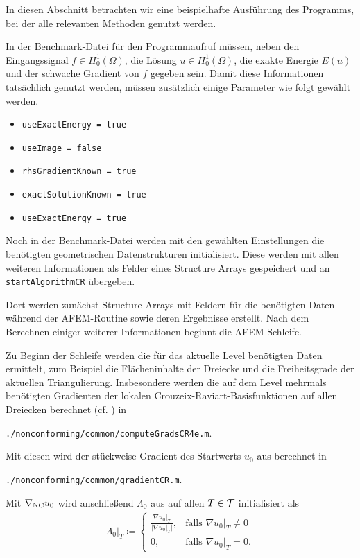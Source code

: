 In diesen Abschnitt betrachten wir eine beispielhafte Ausführung des Programms,
bei der alle relevanten Methoden genutzt werden.

In der Benchmark-Datei für den Programmaufruf müssen, neben den Eingangssignal
$f\in H^1_0(\Omega)$, die Lösung $u\in H^1_0(\Omega)$, die exakte Energie
$E(u)$ und der schwache Gradient von $f$ gegeben sein. 
Damit diese Informationen tatsächlich genutzt werden, müssen zusätzlich einige
Parameter wie folgt gewählt werden.
\begin{itemize}
  \item \texttt{useExactEnergy = true}
  \item \texttt{useImage = false}
  \item \texttt{rhsGradientKnown = true}
  \item \texttt{exactSolutionKnown = true}
  \item \texttt{useExactEnergy = true}
\end{itemize}

Noch in der Benchmark-Datei werden mit den gewählten Einstellungen die
benötigten geometrischen Datenstrukturen initialisiert. 
Diese werden mit allen weiteren Informationen als Felder eines Structure Arrays
gespeichert und an \texttt{startAlgorithmCR} übergeben. 

Dort werden zunächst Structure Arrays mit Feldern für die benötigten Daten
während der AFEM-Routine sowie deren Ergebnisse erstellt. 
Nach dem Berechnen einiger weiterer Informationen beginnt die AFEM-Schleife.

Zu Beginn der Schleife werden die für das aktuelle Level benötigten Daten
ermittelt, zum Beispiel die Flächeninhalte der Dreiecke und die Freiheitsgrade
der aktuellen Triangulierung. 
Insbesondere werden die auf dem Level mehrmals benötigten Gradienten der
lokalen Crouzeix-Raviart-Basisfunktionen auf allen Dreiecken berechnet (cf.
\cite[Abschnitt 1.4.2]{CGKNRR10}) in
\begin{center}
  \texttt{./nonconforming/common/computeGradsCR4e.m}.
\end{center}
Mit diesen wird der stückweise Gradient des Startwerts $u_0$ aus
 berechnet in
\begin{center}
  \texttt{./nonconforming/common/gradientCR.m}.
\end{center}
Mit $\nabla_\textup{NC} u_0$ wird anschließend $\Lambda_0$ aus
 auf allen $T\in\mathcal{T}$ initialisiert als 
\begin{align*}
  \Lambda_0|_T\coloneqq
  \begin{cases}
    \frac{\nabla u_0|_T}{|\nabla u_0|_T|},&\text{falls }\nabla u_0|_T\neq 0\\
    0,&\text{falls }\nabla u_0|_T= 0.
  \end{cases}
\end{align*}

